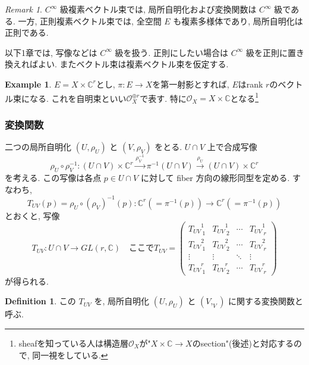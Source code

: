 \documentclass[dvipdfmx,a4paper,11pt]{article} %
\theoremstyle{definition}
\newtheorem{defn}[thm]{Definition}
\newtheorem{example}[thm]{Example}
\theoremstyle{remark}
\newtheorem{remark}[thm]{Remark}
\numberwithin{equation}{section}
\newcommand{\C}{\mathbb{C}}
\begin{document}
\begin{remark}
\(C^\infty\) 級複素ベクトル束では, 局所自明化および変換関数は \(C^\infty\) 級である. 一方, 正則複素ベクトル束では, 全空間 \(E\) も複素多様体であり, 局所自明化は正則である.
\end{remark}

\begin{tcolorbox}[mybox]
以下1章では, 写像などは \(C^{\infty}\) 級を扱う. 正則にしたい場合は \(C^{\infty}\) 級を正則に置き換えればよい. またベクトル束は複素ベクトル束を仮定する. 
\end{tcolorbox}

\begin{example}
$E=X \times \C^r$とし, $\pi : E \to X$を第一射影とすれば, $E$はrank $r$のベクトル束になる. 
これを自明束といい$\mathcal{O}_X^{\oplus r}$で表す. 特に$\mathcal{O}_X=X \times \C$となる\footnote{sheafを知っている人は構造層$\mathcal{O}_X$が"$X \times \C \to X$のsection"(後述)と対応するので, 同一視をしている. }

\end{example}

\subsubsection{変換関数}

二つの局所自明化 \((U,\rho_U)\) と \((V,\rho_V)\) をとる. \(U\cap V\) 上で合成写像
\[
\rho_U\circ \rho_V^{-1}\colon (U\cap V)\times \mathbb{C}^r 
\overset{\rho_V^{-1}}{\longrightarrow} 
\pi^{-1}(U \cap V)
\overset{\rho_U}{\longrightarrow} 
(U\cap V)\times\mathbb{C}^r
\]
を考える. この写像は各点 \(p\in U\cap V\) に対して fiber 方向の線形同型を定める. すなわち,
\[
T_{UV}(p)
=\rho_U\circ (\rho_V)^{-1}(p)
\colon \mathbb{C}^r(=\pi^{-1}(p))\longrightarrow \mathbb{C}^r(=\pi^{-1}(p))
\]
とおくと, 写像
\begin{equation}
T_{UV}\colon U\cap V\longrightarrow GL(r,\mathbb{C})
\quad
\text{ここで}
T_{UV}
=
\begin{pmatrix}
{T_{UV}}^{1}_{\ 1} & {T_{UV}}^{1}_{\ 2}& \cdots & {T_{UV}}^{1}_{\ r}\\
{T_{UV}}^{2}_{\ 1} & {T_{UV}}^{2}_{\ 2}& \cdots & {T_{UV}}^{2}_{\ r}\\
\vdots & \vdots & \ddots & \vdots\\
{T_{UV}}^{r}_{\ 1}& {T_{UV}}^{r}_{\ 2}& \cdots & {T_{UV}}^{r}_{\ r}
\end{pmatrix}
\end{equation}
が得られる. 
\begin{defn}
この \(T_{UV}\) を, 局所自明化 \((U,\rho_U)\) と \((V,_V)\) に関する変換関数と呼ぶ.
\end{defn}
\end{document}
